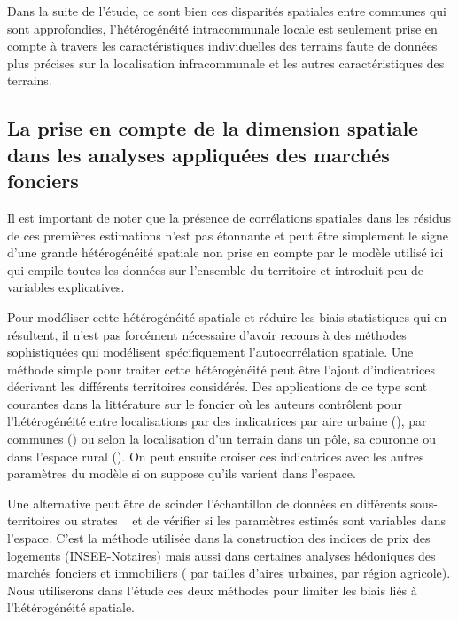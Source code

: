 \documentclass[10.5pt,a4paper]{article}
\begin{document}
{Dans la suite de l'étude, ce sont bien ces disparités spatiales entre communes qui sont approfondies, l'hétérogénéité intracommunale locale est seulement prise en compte à travers les caractéristiques individuelles des terrains faute de données plus précises sur la localisation infracommunale et les autres caractéristiques des terrains. \par    

\subsection{La prise en compte de la dimension spatiale dans les analyses appliquées des marchés fonciers}

Il est important de noter que la présence de corrélations spatiales dans les résidus de ces premières estimations n'est pas étonnante et peut être simplement le signe d'une grande hétérogénéité spatiale non prise en compte par le modèle utilisé ici qui empile toutes les données sur l'ensemble du territoire et introduit peu de variables explicatives. \par  

Pour modéliser cette hétérogénéité spatiale et réduire les biais statistiques qui en résultent, il n'est pas forcément nécessaire d'avoir recours à des méthodes sophistiquées qui modélisent spécifiquement l'autocorrélation spatiale. Une méthode simple pour traiter cette hétérogénéité peut être l'ajout d'indicatrices décrivant les différents territoires considérés. Des applications de ce type sont courantes dans la littérature sur le foncier où les auteurs contrôlent pour l'hétérogénéité entre localisations par des indicatrices par aire urbaine (\cite{Lecat04,Combes_etal12}), par communes (\cite{Geniaux05,Donz_etal07}) ou selon la localisation d'un terrain dans un pôle, sa couronne ou dans l'espace rural (\cite{Cava03}). On peut ensuite croiser ces indicatrices avec les autres paramètres du modèle si on suppose qu'ils varient dans l'espace. \par  

Une alternative peut être de scinder l'échantillon de données en différents sous-territoires ou \og strates \fg~ et de vérifier si les paramètres estimés sont variables dans l'espace. C'est la méthode utilisée dans la construction des indices de prix  des logements (INSEE-Notaires) mais aussi dans certaines analyses hédoniques des marchés fonciers et immobiliers (\cite{Cavailhes05,Vermont15} par tailles d'aires urbaines, \cite{LefeRouq11} par région agricole). Nous utiliserons dans l'étude ces deux méthodes pour limiter les biais liés à l'hétérogénéité spatiale. \par  
    

}
\end{document}
